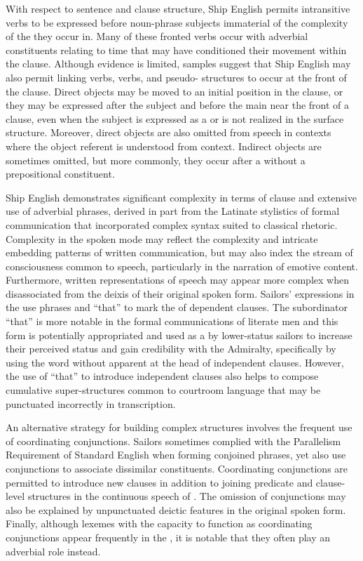 With respect to sentence and clause structure, Ship English permits intransitive verbs to be expressed before noun-phrase subjects immaterial of the complexity of the  they occur in. Many of these fronted verbs occur with adverbial constituents relating to time that may have conditioned their movement within the clause. Although evidence is limited, samples suggest that Ship English may also permit linking verbs,  verbs, and pseudo- structures to occur at the front of the clause. Direct objects may be moved to an initial position in the clause, or they may be expressed after the subject and before the main  near the front of a clause, even when the subject is expressed as a  or is not realized in the surface structure. Moreover, direct objects are also omitted from speech in contexts where the object referent is understood from context.  Indirect objects are sometimes omitted, but more commonly, they occur after a  without a prepositional constituent. 

Ship English demonstrates significant complexity in terms of clause  and extensive use of adverbial phrases, derived in part from the Latinate stylistics of formal communication that incorporated complex syntax suited to classical rhetoric. Complexity in the spoken mode may reflect the complexity and intricate embedding patterns of written communication, but may also index the stream of consciousness common to speech, particularly in the narration of emotive content. Furthermore, written representations of speech may appear more complex when disassociated from the deixis of their original spoken form. Sailors’ expressions in the  use  phrases and “that” to mark the  of dependent clauses. The subordinator “that” is more notable in the formal communications of literate men and this form is potentially appropriated and used as a  by lower-status sailors to increase their perceived status and gain credibility with the Admiralty, specifically by using the word without apparent  at the head of independent clauses. However, the use of “that” to introduce independent clauses also helps to compose cumulative super-structures common to courtroom language that may be punctuated incorrectly in transcription. 

An alternative strategy for building complex structures involves the frequent use of coordinating conjunctions. Sailors sometimes complied with the Parallelism Requirement of Standard English when forming conjoined phrases, yet also use conjunctions to associate dissimilar constituents. Coordinating conjunctions are permitted to introduce new clauses in addition to joining predicate and clause-level structures in the continuous speech of . The omission of conjunctions may also be explained by unpunctuated deictic features in the original spoken form. Finally, although lexemes with the capacity to function as coordinating conjunctions appear frequently in the , it is notable that they often play an adverbial role instead. 

